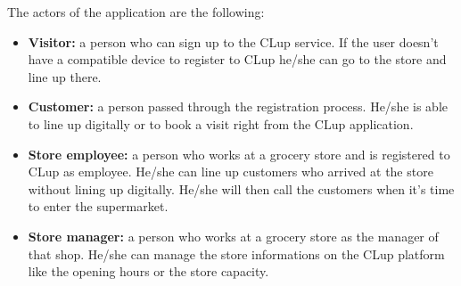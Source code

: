 The actors of the application are the following:
\begin{itemize}
    \item \textbf{Visitor:} a person who can sign up to the CLup service. If the user doesn't have a compatible device to register to CLup he/she can go to the store and line up there.
    \item \textbf{Customer:} a person passed through the registration process. He/she is able to line up digitally or to book a visit right from the CLup application.
    \item \textbf{Store employee:} a person who works at a grocery store and is registered to CLup as employee. He/she can line up customers who arrived at the store without lining up digitally. He/she will then call the customers when it's time to enter the supermarket.
    \item \textbf{Store manager:} a person who works at a grocery store as the manager of that shop. He/she can manage the store informations on the CLup platform like the opening hours or the store capacity.
\end{itemize}
